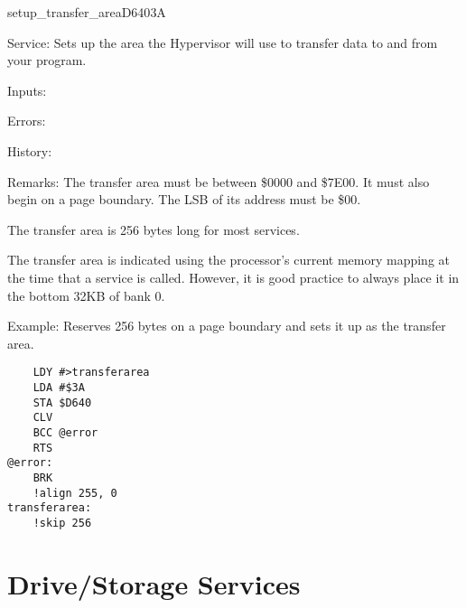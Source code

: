 %
\newpage
\begin{hyppotrap}{setup\_transfer\_area}{D640}{3A}
\item [Service:]
  Sets up the area the Hypervisor will use to transfer data to and from your
  program.
\item [Inputs:]
\item [Errors:]
\item [History:]
\item [Remarks:]
  The transfer area must be between \$0000 and \$7E00. It must also begin on a
  page boundary. The LSB of its address must be \$00.

  The transfer area is 256 bytes long for most services.

  The transfer area is indicated using the processor's current memory mapping at
  the time that a service is called. However, it is good practice to always
  place it in the bottom 32KB of bank 0.
\item [Example:]
  Reserves 256 bytes on a page boundary and sets it up as the transfer area.
\begin{tcolorbox}[colback=black,coltext=white]
\verbatimfont{\codefont}
\begin{verbatim}
    LDY #>transferarea
    LDA #$3A
    STA $D640
    CLV
    BCC @error
    RTS
@error:
    BRK
    !align 255, 0
transferarea:
    !skip 256
\end{verbatim}
\end{tcolorbox}
\end{hyppotrap}



\newpage
\section{Drive/Storage Services}


